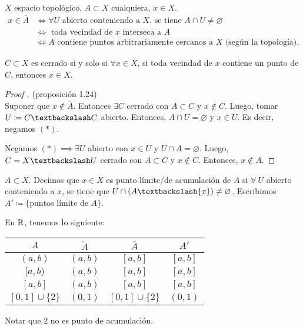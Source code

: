 	\begin{prop}
		$X$ espacio topológico, $A \subset X$ cualquiera, $x \in X$.
		\begin{align*}
			x \in \overline{A} & \iff \forall U \text{ abierto conteniendo a } X \text{, se tiene } A \cap U \neq \varnothing \tag*{($*$)} \\
			& \iff \text{ toda vecindad de } x \text{ interseca a } A \\
			& \iff A \text{ contiene puntos arbitrariamente cercanos a } X \text{ (según la topología)}
		.\end{align*}
	\end{prop}

	\begin{corollary}
		$C \subset X$ es cerrado si y solo si $\forall x \in X$, si toda vecindad de $x$ contiene un punto de $C$, entonces $x \in X$.
	\end{corollary}

	\begin{proof}[Proof ] (proposición 1.24) \\
		\Ifstep Suponer que $x \not\in \overline{A}$. Entonces $\exists C$ cerrado con $A \subset C$ y $x \not\in C$. Luego, tomar $U \coloneq C \textbackslash C$ abierto. Entonces, $A \cap U = \varnothing$ y $x \in U$. Es decir, negamos $(*)$.

		\noindent \Onlyifstep Negamos $(*) \implies \exists U$ abierto con $x \in U$ y $U \cap A = \varnothing$. Luego, $C = X \textbackslash U$ cerrado con $A \subset C$ y $x \not\in C$. Entonces, $x \not\in A$.
	\end{proof}

	\begin{definition}
		$A \subset X$. Decimos que $x \in X$ es punto límite/de acumulación de $A$ si $\forall \ U$ abierto conteniendo a $x$, se tiene que $U \cap ( A \textbackslash \{ x \} ) \neq \varnothing$. Escribimos $A' \coloneq \{ \text{puntos límite de } A \}$.
	\end{definition}

	\begin{eg}
		En $\mathbb{R}$, tenemos lo siguiente:
		\begin{center}
		\begin{tabular}{ | c | c | c | c | }
			\hline
			$A$ & $\mathring{A}$ & $\overline{A}$ & $A'$ \\
			\hline
			$(a,b)$ & $(a,b)$ & $[a,b]$ & $[a,b]$ \\
			$[a,b)$ & $(a,b)$ & $[a,b]$ & $[a,b]$ \\
			$[a,b]$ & $(a,b)$ & $[a,b]$ & $[a,b]$ \\
			$[0,1] \cup \{2\}$ & $(0,1)$ & $[0,1] \cup \{2\}$ & $(0,1)$ \\
			\hline
		\end{tabular}
		\end{center}
		\noindent Notar que $2$ no es punto de acumulación.
	\end{eg}

